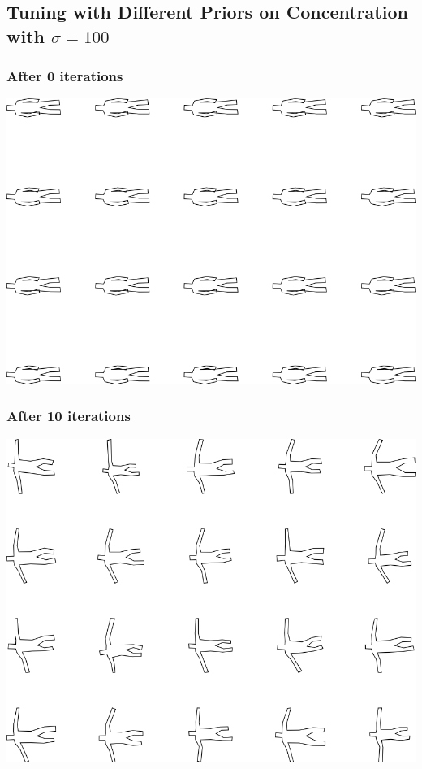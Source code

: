 \subsection{Tuning with Different Priors on Concentration with $\sigma=100$}

\subsubsection{After 0 iterations}

\includegraphics[width=6in]{output/3.learning/concentration/concentration_psw100_iter0_.png}
\subsubsection{After 10 iterations}

\includegraphics[width=6in]{output/3.learning/concentration/concentration_psw100_iter10_.png}
